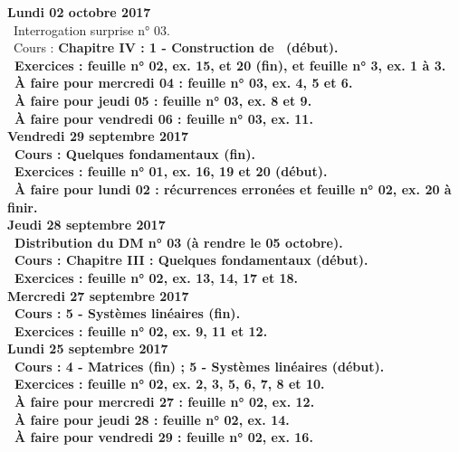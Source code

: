 \documentclass[12pt,a4paper]{article}
\begin{document}
\noindent\textbf{\bf Lundi 02 octobre 2017}\\
\bu\ Interrogation surprise n° 03.\\
\bu\ Cours : \bf Chapitre IV \rm : 1 - Construction de \C\ (début).\\
\bu\ Exercices : feuille n° 02, ex. 15, et 20 (fin), et feuille n° 3, ex. 1 à 3.\\
\bu\ À faire pour mercredi 04 : feuille n° 03, ex. 4, 5 et 6.\\
\bu\ À faire pour jeudi 05 : feuille n° 03, ex. 8 et 9.\\
\bu\ À faire pour vendredi 06 : feuille n° 03, ex. 11.\vspace{.4cm}\\

\noindent\textbf{Vendredi 29 septembre 2017}\\
\bu\ Cours : Quelques fondamentaux (fin).\\
\bu\ Exercices : feuille n° 01, ex. 16, 19 et 20 (début).\\
\bu\ À faire pour lundi 02 : récurrences erronées et feuille n° 02, ex. 20 à finir.\vspace{.4cm}\\

\noindent\textbf{Jeudi 28 septembre 2017}\\
\bu\ Distribution du DM n° 03 (à rendre le 05 octobre).\\
\bu\ Cours : \bf Chapitre III \rm : Quelques fondamentaux (début).\\
\bu\ Exercices : feuille n° 02, ex. 13, 14, 17 et 18.\vspace{.4cm}\\

\noindent\textbf{\bf Mercredi 27 septembre 2017}\\
\bu\ Cours : 5 - Systèmes linéaires (fin).\\
\bu\ Exercices : feuille n° 02, ex. 9, 11 et 12.\vspace{.4cm}\\

\noindent\textbf{\bf Lundi 25 septembre 2017}\\
\bu\ Cours : 4 - Matrices (fin) ; 5 - Systèmes linéaires (début).\\
\bu\ Exercices : feuille n° 02, ex. 2, 3, 5, 6, 7, 8 et 10.\\
\bu\ À faire pour mercredi 27 : feuille n° 02, ex. 12.\\
\bu\ À faire pour jeudi 28 : feuille n° 02, ex. 14.\\
\bu\ À faire pour vendredi 29 : feuille n° 02, ex. 16.\vspace{.4cm}\\
\end{document}

